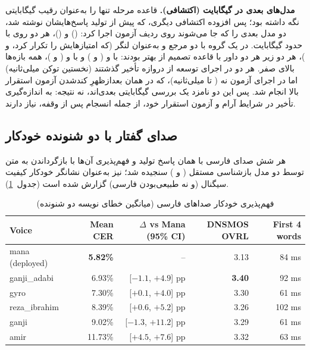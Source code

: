 \textbf{مدل‌های بعدی در  گیگابایت (اکتشافی).} قاعده مرحله  تنها
 را به‌عنوان رقیب  گیگابایتی نگه داشته بود؛ پس افزوده اکتشافی دیگری، که
پیش از تولید پاسخ‌هایشان نوشته شد، دو مدل بعدی را که جا می‌شوند روی  ردیف آزمون
اجرا کرد:  () و  ()، هر
دو روی  با حدود  گیگابایت. در یک گروه با دو مرجع و 
به‌عنوان لنگر (که امتیازهایش را تکرار کرد،  و )، هر دو زیر هر دو داور
با قاعده تصمیم از  بهتر بودند:  با  و 
( و ) و  با  و  ( و
)، همه بازه‌ها بالای صفر. هر دو در اجرای توسعه از دروازه تأخیر گذشتند
(نخستین توکن  میلی‌ثانیه) اما در اجرای آزمون نه ( تا 
میلی‌ثانیه)، که در همان بعدازظهرِ کندشدن آزمون استقرار بالا انجام شد. پس این دو
نامزد یک بررسی  گیگابایتی بعدی‌اند، نه نتیجه: به اندازه‌گیری تأخیر در شرایط
آرام و آزمون استقرار خود، از جمله انسجام پس از وقفه، نیاز دارند.

\subsection{صدای گفتار با دو شنونده خودکار}

هر شش صدای فارسی  با همان  پاسخ تولید و فهم‌پذیری آن‌ها با
بازگرداندن به متن توسط دو مدل بازشناسی مستقل ( و )
سنجیده شد؛  نیز به‌عنوان نشانگر خودکار کیفیت سیگنال (و نه
طبیعی‌بودن فارسی) گزارش شده است (جدول~\ref{tab:tts-v2}).

\begin{table}[ht]
\centering
\caption{فهم‌پذیری خودکار صداهای فارسی  (میانگین خطای نویسه دو شنونده)}
\label{tab:tts-v2}
\small
\begin{latin}
\begin{tabular}{lrrrr}
\toprule
Voice & Mean CER & $\Delta$ vs Mana (95\% CI) & DNSMOS OVRL & First 4 words \\
\midrule
mana (deployed) & \textbf{5.82\%} & -- & 3.13 & 84 ms \\
ganji\_adabi & 6.93\% & [$-1.1$, $+4.9$] pp & \textbf{3.40} & 92 ms \\
gyro & 7.30\% & [$+0.1$, $+4.0$] pp & 3.30 & 61 ms \\
reza\_ibrahim & 8.39\% & [$+0.6$, $+5.2$] pp & 3.26 & 102 ms \\
ganji & 9.02\% & [$-1.3$, $+11.2$] pp & 3.29 & 61 ms \\
amir & 11.73\% & [$+4.5$, $+7.6$] pp & 3.32 & 63 ms \\
\bottomrule
\end{tabular}
\end{latin}
\end{table}

